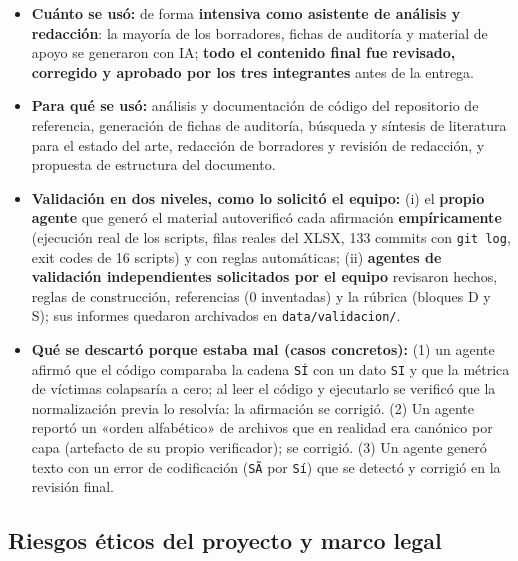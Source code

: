 \begin{itemize}
  \item \textbf{Cuánto se usó:} de forma \textbf{intensiva como asistente de
        análisis y redacción}: la mayoría de los borradores, fichas de
        auditoría y material de apoyo se generaron con IA; \textbf{todo el
        contenido final fue revisado, corregido y aprobado por los tres
        integrantes} antes de la entrega.
  \item \textbf{Para qué se usó:} análisis y documentación de código del
        repositorio de referencia, generación de fichas de auditoría, búsqueda
        y síntesis de literatura para el estado del arte, redacción de
        borradores y revisión de redacción, y propuesta de estructura del
        documento.
  \item \textbf{Validación en dos niveles, como lo solicitó el equipo:}
        (i) el \textbf{propio agente} que generó el material autoverificó cada
        afirmación \textbf{empíricamente} (ejecución real de los scripts, filas
        reales del XLSX, 133 commits con \texttt{git log}, exit codes de 16
        scripts) y con reglas automáticas; (ii) \textbf{agentes de validación
        independientes solicitados por el equipo} revisaron hechos, reglas de
        construcción, referencias (0 inventadas) y la rúbrica (bloques D y S);
        sus informes quedaron archivados en \texttt{data/validacion/}.
  \item \textbf{Qué se descartó porque estaba mal (casos concretos):}
        (1) un agente afirmó que el código comparaba la cadena \texttt{SÍ}
        con un dato \texttt{SI} y que la métrica de víctimas colapsaría a
        cero; al leer el código y ejecutarlo se verificó que la normalización
        previa lo resolvía: la afirmación se corrigió. (2) Un agente reportó un
        «orden alfabético» de archivos que en realidad era canónico por capa
        (artefacto de su propio verificador); se corrigió. (3) Un agente generó
        texto con un error de codificación (\texttt{SÃ} por \texttt{Sí}) que se
        detectó y corrigió en la revisión final.
\end{itemize}

\subsection{Riesgos éticos del proyecto y marco legal}

